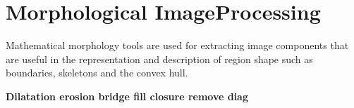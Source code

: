 \section{Morphological ImageProcessing}

Mathematical morphology tools are used for extracting image components that are useful in the representation and description of region shape such as boundaries, skeletons and the convex hull.

{\bf Dilatation
erosion
bridge
fill
closure
remove
diag}
